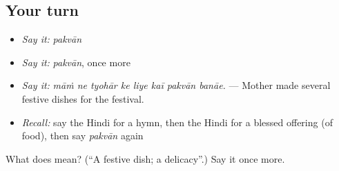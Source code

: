 \subsection*{Your turn}
\begin{itemize}
\raggedright
  \item \emph{Say it:} \emph{pakvān}
  \item \emph{Say it:} \emph{pakvān}, once more
  \item \emph{Say it:} \emph{māṁ ne tyohār ke liye kaī pakvān banāe.} — Mother made several festive dishes for the festival.
  \item \emph{Recall:} say the Hindi for a hymn, then the Hindi for a blessed offering (of food), then say \emph{pakvān} again
\end{itemize}

\begin{tcolorbox}[breakable,colback=teal!4,colframe=teal!35!black,title={Before you move on}]
What does  mean? (\textquotedblleft{}A festive dish; a delicacy\textquotedblright{}.) Say it once more.
\end{tcolorbox}
